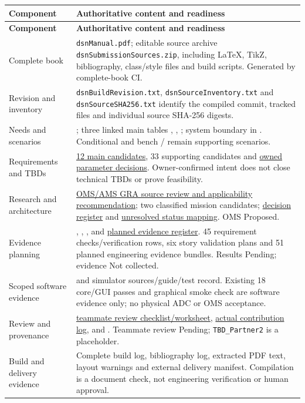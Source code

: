 \begin{tabularx}{\linewidth}{L{3.0cm}Y}
\caption{Submission Package Inventory\label{Table:SubmissionInventory}}\\
\toprule
\textbf{Component} & \textbf{Authoritative content and readiness}\\
\midrule\endfirsthead
\textbf{Component} & \textbf{Authoritative content and readiness}\\
\midrule\endhead
\bottomrule\endlastfoot
Complete book & \texttt{dsnManual.pdf}; editable source archive
\texttt{dsnSubmissionSources.zip}, including LaTeX, TikZ, bibliography,
class/style files and build scripts. Generated by complete-book CI.\\
Revision and inventory & \texttt{dsnBuildRevision.txt},
\texttt{dsnSourceInventory.txt} and \texttt{dsnSourceSHA256.txt} identify
the compiled commit, tracked files and individual source SHA-256 digests.\\
Needs and scenarios & ; three linked main tables
, , ; system boundary
in . Conditional  and bench
/ remain supporting scenarios.\\
Requirements and TBDs & \hyperref[Table:MainBaseline]{12 main candidates},
33 supporting candidates and \hyperref[Table:RequirementParameters]{owned parameter decisions}.
Owner-confirmed intent does not close technical TBDs or prove feasibility.\\
Research and architecture & \hyperref[Section:OMSResearch]{OMS/AMS GRA
source review and applicability recommendation}; two classified mission
candidates; \hyperref[Table:OMSDecisionFields]{decision register} and
\hyperref[Table:OMSStatusMapping]{unresolved status mapping}. OMS Proposed.\\
Evidence planning & , ,
,  and
\hyperref[Section:PlannedEvidence]{planned evidence register}.
45 requirement checks/verification rows, six story validation plans and
51 planned engineering evidence bundles. Results Pending; evidence Not collected.\\
Scoped software evidence &  and
simulator sources/guide/test record. Existing 18 core/GUI passes and graphical
smoke check are software evidence only; no physical ADC or OMS acceptance.\\
Review and provenance & \hyperref[Section:HumanReviewChecklist]{teammate
review checklist/worksheet}, \hyperref[Section:TeamContributionLog]{actual
contribution log},  and .
Teammate review Pending; \texttt{TBD\_Partner2} is a placeholder.\\
Build and delivery evidence & Complete build log, bibliography log, extracted
PDF text, layout warnings and external delivery manifest. Compilation is a
document check, not engineering verification or human approval.\\
\end{tabularx}

